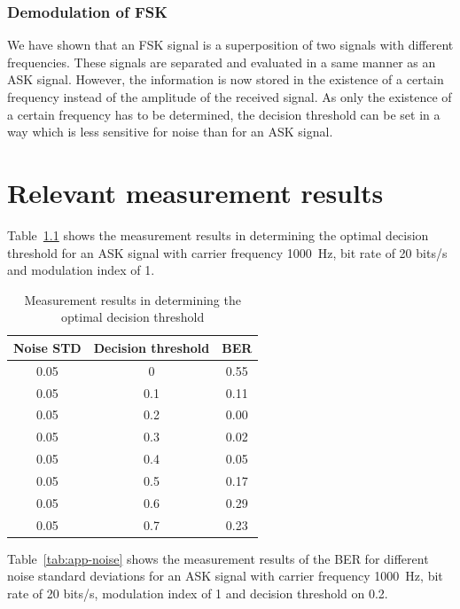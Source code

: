 \documentclass[11pt,titlepage]{report}
\begin{document}
\begin{appendices}
\subsection{Demodulation of FSK}
We have shown that an FSK signal is a superposition of two signals with different frequencies. These signals are separated and evaluated in a same manner as an ASK signal. However, the information is now stored in the existence of a certain frequency instead of the amplitude of the received signal. As only the existence of a certain frequency has to be determined, the decision threshold can be set in a way which is less sensitive for noise than for an ASK signal.

\chapter{Relevant measurement results}
\label{app:res}

Table~\ref{tab:app-th} shows the measurement results in determining the optimal decision threshold for an ASK signal with carrier frequency \SI{1000}{Hz}, bit rate of \num{20} bits/s and modulation index of \num{1}.

\begin{table}[H]
	\centering
	\caption{Measurement results in determining the optimal decision threshold}
	\label{tab:app-th}
	\begin{tabular}{c c c}
		\hline\hline
		Noise STD & Decision threshold & BER \\
		\hline
		\num{0.05} & \num{0} & \num{0.55} \\ \hline
		\num{0.05} & \num{0.1} & \num{0.11} \\ \hline
		\num{0.05} & \num{0.2} & \num{0.00} \\ \hline
		\num{0.05} & \num{0.3} & \num{0.02} \\ \hline
		\num{0.05} & \num{0.4} & \num{0.05} \\ \hline
		\num{0.05} & \num{0.5} & \num{0.17} \\ \hline
		\num{0.05} & \num{0.6} & \num{0.29} \\ \hline
		\num{0.05} & \num{0.7} & \num{0.23} \\ \hline
		\hline
	\end{tabular}
\end{table}

Table~\ref{tab:app-noise} shows the measurement results of the BER for different noise standard deviations for an ASK signal with carrier frequency \SI{1000}{Hz}, bit rate of \num{20} bits/s, modulation index of \num{1} and decision threshold on \num{0.2}.


\end{appendices}
\end{document}
